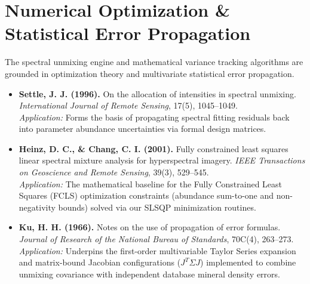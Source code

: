 \documentclass[11pt,letterpaper]{article}
\begin{document}
\section{Numerical Optimization \& Statistical Error Propagation}
The spectral unmixing engine and mathematical variance tracking algorithms are grounded in optimization theory and multivariate statistical error propagation.

\begin{itemize}
    \item \textbf{Settle, J. J. (1996).} On the allocation of intensities in spectral unmixing. \textit{International Journal of Remote Sensing}, 17(5), 1045--1049. \\
    \textit{Application:} Forms the basis of propagating spectral fitting residuals back into parameter abundance uncertainties via formal design matrices.
    
    \item \textbf{Heinz, D. C., \& Chang, C. I. (2001).} Fully constrained least squares linear spectral mixture analysis for hyperspectral imagery. \textit{IEEE Transactions on Geoscience and Remote Sensing}, 39(3), 529--545. \\
    \textit{Application:} The mathematical baseline for the Fully Constrained Least Squares (FCLS) optimization constraints (abundance sum-to-one and non-negativity bounds) solved via our SLSQP minimization routines.
    
    \item \textbf{Ku, H. H. (1966).} Notes on the use of propagation of error formulas. \textit{Journal of Research of the National Bureau of Standards}, 70C(4), 263--273. \\
    \textit{Application:} Underpins the first-order multivariable Taylor Series expansion and matrix-bound Jacobian configurations ($J^T \Sigma J$) implemented to combine unmixing covariance with independent database mineral density errors.
\end{itemize}
\end{document}
